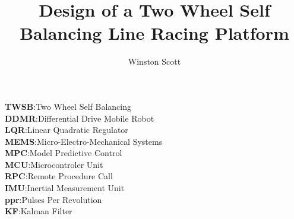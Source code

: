     
    \newcommand{\degree}{\ensuremath{^\circ}}
    \newcommand{\sus}[1]{$^{\mbox{\scriptsize #1}}$} %
    \newcommand{\sub}[1]{$_{\mbox{\scriptsize #1}}$} %
    \newcommand{\sect}[1]{Section~\ref{#1}}
    \newcommand{\fig}[1]{Fig.~\ref{#1}}
    \newcommand{\tab}[1]{Table~\ref{#1}}
    \newcommand{\equ}[1]{(\ref{#1})}
    \newcommand{\appx}[1]{Appendix~\ref{#1}}
    \usepackage[style=ieee,backend=biber,backref=true,hyperref=auto]{biblatex}
    
    

    
    \makeatletter
    \title{Design of a Two Wheel Self Balancing Line Racing Platform} %
    \author{Winston Scott}
    \makeatother                                               
    \maketitle

    \uomtoc
    \begin{uomterms}
        \textbf{TWSB}:Two Wheel Self Balancing \\
        \textbf{DDMR}:Differential Drive Mobile Robot \\
        \textbf{LQR}:Linear Quadratic Regulator \\
        \textbf{MEMS}:Micro-Electro-Mechanical Systems \\
        \textbf{MPC}:Model Predictive Control \\
        \textbf{MCU}:Microcontroler Unit \\
        \textbf{RPC}:Remote Procedure Call \\
        \textbf{IMU}:Inertial Measurement Unit \\
        \textbf{ppr}:Pulses Per Revolution \\
        \textbf{KF}:Kalman Filter \\
    \end{uomterms}

